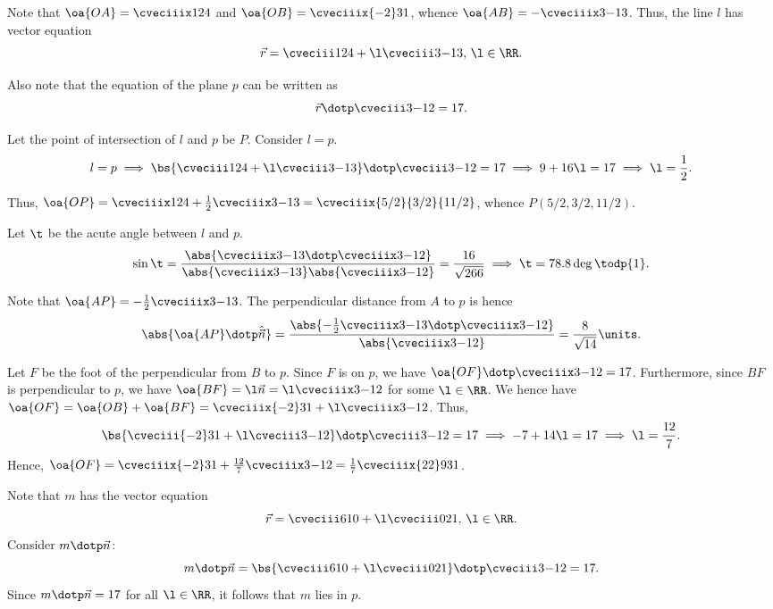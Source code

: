 \begin{solution}
    Note that $\oa{OA} = \cveciiix124$ and $\oa{OB} = \cveciiix{-2}31$, whence $\oa{AB} = -\cveciiix3{-1}3$. Thus, the line $l$ has vector equation \[\vec r = \cveciii124 + \l\cveciii3{-1}3, \, \l \in \RR.\]

    Also note that the equation of the plane $p$ can be written as \[\vec r \dotp \cveciii3{-1}2 = 17.\]

    \begin{ppart}
        Let the point of intersection of $l$ and $p$ be $P$. Consider $l = p$. \[l = p \implies \bs{\cveciii124 + \l\cveciii3{-1}3} \dotp \cveciii3{-1}2 = 17 \implies 9 + 16\l = 17 \implies \l = \frac12.\]

        Thus, $\oa{OP} = \cveciiix124 + \frac12\cveciiix3{-1}3 = \cveciiix{5/2}{3/2}{11/2}$, whence $P(5/2, 3/2, 11/2)$.

    \end{ppart}
    \begin{ppart}
        Let $\t$ be the acute angle between $l$ and $p$. \[\sin\t = \frac{\abs{\cveciiix3{-1}3 \dotp \cveciiix3{-1}2}}{\abs{\cveciiix3{-1}3} \abs{\cveciiix3{-1}2}} = \frac{16}{\sqrt{266}} \implies \t = 78.8 \deg \todp{1}.\]
    \end{ppart}
    \begin{ppart}
        Note that $\oa{AP} = -\frac12 \cveciiix3{-1}3$. The perpendicular distance from $A$ to $p$ is hence \[\abs{\oa{AP} \dotp \hat{\vec n}} = \frac{\abs{-\frac12\cveciiix3{-1}3 \dotp \cveciiix3{-1}2}}{\abs{\cveciiix3{-1}2}} = \frac8{\sqrt{14}} \units.\]
    \end{ppart}
    \begin{ppart}
        Let $F$ be the foot of the perpendicular from $B$ to $p$. Since $F$ is on $p$, we have $\oa{OF} \dotp \cveciiix3{-1}2 = 17$. Furthermore, since $BF$ is perpendicular to $p$, we have $\oa{BF} = \l \vec n = \l \cveciiix3{-1}2$ for some $\l \in \RR$. We hence have $\oa{OF} = \oa{OB} + \oa{BF} = \cveciiix{-2}31 + \l \cveciiix3{-1}2$. Thus, \[\bs{\cveciii{-2}31 + \l \cveciii3{-1}2} \dotp \cveciii3{-1}2 = 17 \implies -7 + 14\l = 17 \implies \l = \frac{12}7.\] Hence, $\oa{OF} = \cveciiix{-2}31 + \frac{12}7 \cveciiix3{-1}2 = \frac17\cveciiix{22}9{31}$.
    \end{ppart}
    \begin{ppart}
        Note that $m$ has the vector equation \[\vec r = \cveciii610 + \l \cveciii021, \, \l \in \RR.\] Consider $m \dotp \vec n$: \[ m \dotp \vec n = \bs{\cveciii610 + \l \cveciii021} \dotp \cveciii3{-1}2 = 17.\] Since $m \dotp \vec n = 17$ for all $\l \in \RR$, it follows that $m$ lies in $p$.
    \end{ppart}
\end{solution}

